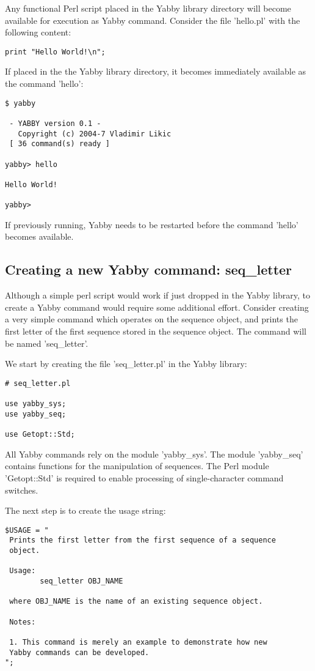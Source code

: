 Any functional Perl script placed in the Yabby library directory
will become available for execution as Yabby command.  Consider
the file 'hello.pl' with the following content:

\begin{verbatim}
print "Hello World!\n";
\end{verbatim}

If placed in the the Yabby library directory, it becomes immediately
available as the command 'hello':

\begin{verbatim}
$ yabby

 - YABBY version 0.1 - 
   Copyright (c) 2004-7 Vladimir Likic
 [ 36 command(s) ready ]

yabby> hello

Hello World!

yabby>
\end{verbatim}

If previously running, Yabby needs to be restarted before the command
'hello' becomes available.

\subsection{Creating a new Yabby command: seq\_letter}

Although a simple perl script would work if just dropped in the Yabby
library, to create a Yabby command would require some additional effort.
Consider creating a very simple command which operates on the sequence
object, and prints the first letter of the first sequence stored in
the sequence object. The command will be named 'seq\_letter'.

We start by creating the file 'seq\_letter.pl' in the Yabby library:

\begin{verbatim}
# seq_letter.pl

use yabby_sys;
use yabby_seq;

use Getopt::Std;
\end{verbatim}

All Yabby commands rely on the module 'yabby\_sys'. The module 'yabby\_seq'
contains functions for the manipulation of sequences. The Perl module
'Getopt::Std' is required to enable processing of single-character
command switches.

The next step is to create the usage string:

\begin{verbatim}
$USAGE = "
 Prints the first letter from the first sequence of a sequence
 object. 

 Usage:
        seq_letter OBJ_NAME

 where OBJ_NAME is the name of an existing sequence object.

 Notes:

 1. This command is merely an example to demonstrate how new
 Yabby commands can be developed.
";
\end{verbatim}


